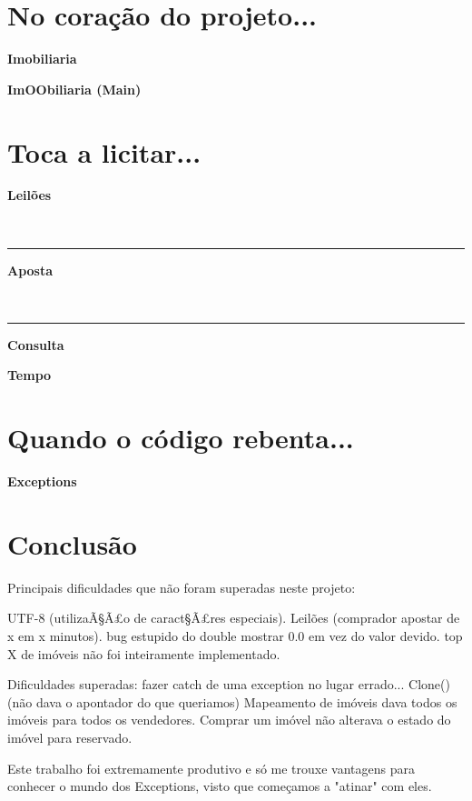\documentclass[12pt]{article}
\newenvironment{code}                    
{\textbf{
} \hspace{1cm} \hrulefill \\ 
\smallskip 
\begin{center}
\begin{minipage}{0.9\textwidth} 
\begin{alltt}\small}
{\end{alltt}
\end{minipage}
\end{center}
\hrule\smallskip
}
\begin{document}


\section{No coração do projeto...}

\textbf{Imobiliaria}



\pagebreak

\textbf{ImOObiliaria (Main)}

\section{Toca a licitar...}

\textbf{Leilões}

\begin{code}

\end{code}


\pagebreak

\textbf{Aposta}

\begin{code}

\end{code}

\textbf{Consulta}

\textbf{Tempo}

\pagebreak

\section{Quando o código rebenta...}

\textbf{Exceptions}
\pagebreak

 
\section{Conclusão}

Principais dificuldades que não foram superadas neste projeto:

UTF-8 (utilizaÃ§Ã£o de caract§Ã£res especiais).
Leilões (comprador apostar de x em x minutos).
bug estupido do double mostrar 0.0 em vez do valor devido.
top X de imóveis não foi inteiramente implementado.

Dificuldades superadas:
fazer catch de uma exception no lugar errado...
Clone() (não dava o apontador do que queriamos)
Mapeamento de imóveis dava todos os imóveis para todos os vendedores.
Comprar um imóvel não alterava o estado do imóvel para reservado.


Este trabalho foi extremamente produtivo e só me trouxe vantagens para conhecer o mundo dos Exceptions, visto que começamos a "atinar" com eles.
\end{document}
